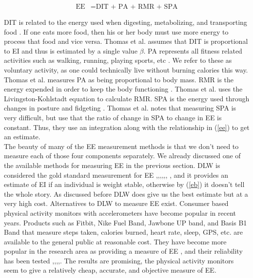 \documentclass[11pt]{article}\usepackage[]{graphicx}\usepackage[]{color}
\begin{document}
\begin{align}
  \text{EE} &= \text{DIT + PA + RMR + SPA}
	\label{ee}
\end{align}

DIT is related to the energy used when digesting, metabolizing, and transporting food \cite{thomas11a}. If one eats more food, then his or her body must use more energy to process that food and vice versa. Thomas et al. assumes that DIT is proportional to EI and thus is estimated by a single value $\beta$. PA represents all fitness related activities such as walking, running, playing sports, etc \cite{thomas11a}. We refer to these as voluntary activity, as one could technically live without burning calories this way. Thomas et al. measures PA as being proportional to body mass. RMR is the energy expended in order to keep the body functioning \cite{thomas11a}. Thomas et al. uses the Livingston-Kohlstadt equation to calculate RMR. SPA is the energy used through changes in posture and fidgeting \cite{thomas11a}. Thomas et al. notes that measuring SPA is very difficult, but use that the ratio of change in SPA to change in  EE is constant. Thus, they use an integration along with the relationship in (\ref{ee}) to get an estimate. \\

The beauty of many of the EE measurement methods is that we don't need to measure each of those four components separately. We already discussed one of the available methods for measuring EE in the previous section. DLW is considered the gold standard measurement for EE \cite{lagerros},\cite{bouten},\cite{thomas11},\cite{hall11},\cite{gilmore},\cite{sanghvi15}, \cite{racette11}, and it provides an estimate of EI if an individual is weight stable, otherwise by (\ref{eb}) it doesn't tell the whole story. As discussed before DLW does give us the best estimate but at a very high cost. Alternatives to DLW to measure EE exist. Consumer based physical activity monitors with accelerometers have become popular in recent years. Products such as Fitbit, Nike Fuel Band, Jawbone UP band, and Basis B1 Band that measure steps taken, calories burned, heart rate, sleep, GPS, etc. are available to the general public at reasonable cost. They have become more popular in the research area as providing a measure of EE \cite{welk04}, and their reliability has been tested \cite{bassett00},\cite{drenowatz11},\cite{johannsen10},\cite{dannecker13},\cite{lee}. The results are promising, the physical activity monitors seem to give a relatively cheap, accurate, and objective measure of EE. \\
\end{document}
